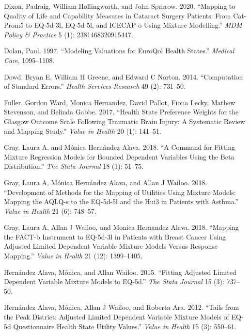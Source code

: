 \documentclass[
]{article}
\newlength{\cslhangindent}
\newenvironment{CSLReferences}[2] %
 {%
  \setlength{\parindent}{0pt}
  \ifodd #1 \everypar{\setlength{\hangindent}{\cslhangindent}}\ignorespaces\fi
  \ifnum #2 > 0
  \setlength{\parskip}{#2\baselineskip}
  \fi
 }%
 {}
\begin{document}
\hypertarget{refs}{}
\begin{CSLReferences}{1}{0}
\leavevmode{}%
Dixon, Padraig, William Hollingworth, and John Sparrow. 2020. {``Mapping to Quality of Life and Capability Measures in Cataract Surgery Patients: From Cat-Prom5 to EQ-5d-3l, EQ-5d-5l, and ICECAP-o Using Mixture Modelling.''} \emph{MDM Policy \& Practice} 5 (1): 2381468320915447.

\leavevmode{}%
Dolan, Paul. 1997. {``Modeling Valuations for EuroQol Health States.''} \emph{Medical Care}, 1095--1108.

\leavevmode{}%
Dowd, Bryan E, William H Greene, and Edward C Norton. 2014. {``Computation of Standard Errors.''} \emph{Health Services Research} 49 (2): 731--50.

\leavevmode{}%
Fuller, Gordon Ward, Monica Hernandez, David Pallot, Fiona Lecky, Mathew Stevenson, and Belinda Gabbe. 2017. {``Health State Preference Weights for the Glasgow Outcome Scale Following Traumatic Brain Injury: A Systematic Review and Mapping Study.''} \emph{Value in Health} 20 (1): 141--51.

\leavevmode{}%
Gray, Laura A, and Mónica Hernández Alava. 2018. {``A Command for Fitting Mixture Regression Models for Bounded Dependent Variables Using the Beta Distribution.''} \emph{The Stata Journal} 18 (1): 51--75.

\leavevmode{}%
Gray, Laura A, Mónica Hernández Alava, and Allan J Wailoo. 2018. {``Development of Methods for the Mapping of Utilities Using Mixture Models: Mapping the AQLQ-s to the EQ-5d-5l and the Hui3 in Patients with Asthma.''} \emph{Value in Health} 21 (6): 748--57.

\leavevmode{}%
Gray, Laura A, Allan J Wailoo, and Monica Hernandez Alava. 2018. {``Mapping the FACT-b Instrument to EQ-5d-3l in Patients with Breast Cancer Using Adjusted Limited Dependent Variable Mixture Models Versus Response Mapping.''} \emph{Value in Health} 21 (12): 1399--1405.

\leavevmode{}%
Hernández Alava, Mónica, and Allan Wailoo. 2015. {``Fitting Adjusted Limited Dependent Variable Mixture Models to {EQ-5d}.''} \emph{The Stata Journal} 15 (3): 737--50.

\leavevmode{}%
Hernández Alava, Mónica, Allan J Wailoo, and Roberta Ara. 2012. {``Tails from the Peak District: Adjusted Limited Dependent Variable Mixture Models of {EQ-5d} Questionnaire Health State Utility Values.''} \emph{Value in Health} 15 (3): 550--61.


\end{CSLReferences}
\end{document}
